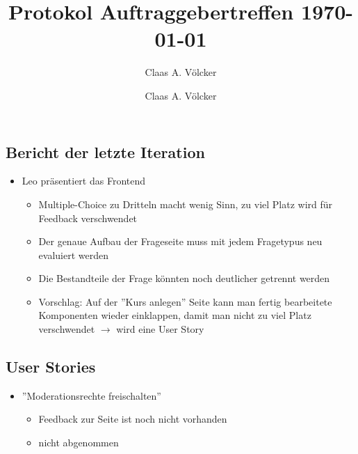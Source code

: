 \documentclass[colorback, accentcolor=tud1c, paper=a4]{tudexercise}
\title{Protokol Auftraggebertreffen \today}
\subtitle{Claas A. Völcker}
\author{Claas A. Völcker}
\begin{document}
	
\maketitle

\begin{multicols}{2}

\section{Bericht der letzte Iteration}
\begin{itemize}
	\item Leo präsentiert das Frontend
	\begin{itemize}
		\item Multiple-Choice zu Dritteln macht wenig Sinn, zu viel Platz wird für Feedback verschwendet
		\item Der genaue Aufbau der Frageseite muss mit jedem Fragetypus neu evaluiert werden
		\item Die Bestandteile der Frage könnten noch deutlicher getrennt werden
		\item Vorschlag: Auf der ''Kurs anlegen'' Seite kann man fertig bearbeitete Komponenten wieder einklappen, damit man nicht zu viel Platz verschwendet $\rightarrow$ wird eine User Story
	\end{itemize}
\end{itemize}

\subsection{User Stories}
\begin{itemize}
	\item ''Moderationsrechte freischalten''
	\begin{itemize}
		\item Feedback zur Seite ist noch nicht vorhanden
		\item nicht abgenommen
	\end{itemize}
\end{itemize}


\end{multicols}
\end{document}
